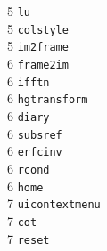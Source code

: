 \begin{footnotesize}
\begin{multicols}{3}
\vspace{-.153cm} 5     \hspace{.2cm} {\tt lu                  }   \\ %
\vspace{-.153cm} 5     \hspace{.2cm} {\tt colstyle            }   \\ %
\vspace{-.153cm} 5     \hspace{.2cm} {\tt im2frame            }   \\ %
\vspace{-.153cm} 6     \hspace{.2cm} {\tt frame2im            }   \\ %
\vspace{-.153cm} 6     \hspace{.2cm} {\tt ifftn               }   \\ %
\vspace{-.153cm} 6     \hspace{.2cm} {\tt hgtransform         }   \\ %
\vspace{-.153cm} 6     \hspace{.2cm} {\tt diary               }   \\ %
\vspace{-.153cm} 6     \hspace{.2cm} {\tt subsref             }   \\ %
\vspace{-.153cm} 6     \hspace{.2cm} {\tt erfcinv             }   \\ %
\vspace{-.153cm} 6     \hspace{.2cm} {\tt rcond               }   \\ %
\vspace{-.153cm} 6     \hspace{.2cm} {\tt home                }   \\ %
\vspace{-.153cm} 7     \hspace{.2cm} {\tt uicontextmenu       }   \\ %
\vspace{-.153cm} 7     \hspace{.2cm} {\tt cot                 }   \\ %
\vspace{-.153cm} 7     \hspace{.2cm} {\tt reset               }   \\ %

\end{multicols}
\end{footnotesize}
